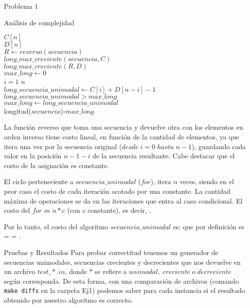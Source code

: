 \begin{section}{Problema 1}
\begin{subsection}{Análisis de complejidad}
		\vspace{0.5cm}
		\begin{pseudo}
			\tab $C[n]$\\
			\tab $D[n]$\\
			\tab $R \leftarrow reverso(secuencia)$ 		 \\
			\tab $long\_max\_creciente(secuencia,C)$ 	\\
			\tab $long\_max\_creciente(R,D)$		\\
			\tab $max\_long \leftarrow 0$			\\
			\tab \FOR $i=1$ \TO $n$				\\
			\tab \tab $long\_secuencia\_unimodal\leftarrow C[i]+D[n-i]-1$ 	\\
			\tab \tab \IF $ long\_secuencia\_unimodal >  max\_long$ 	\\
			\tab \tab \tab $max\_long \leftarrow long\_secuencia\_unimodal$ \\
			\tab \RET longitud($secuencia$)-$max\_long$ 			\\
		\end{pseudo}
		
		La función reverso que toma una secuencia y devuelve otra con los elementos en orden inverso tiene costo lineal, en función 
		de la cantidad de elementos, ya que itera una vez por la secuencia original ($desde\; i=0\; hasta\; n-1$), guardando cada valor en 
		la posición $n-1-i$ de la secuencia resultante. Cabe destacar que el costo de la asignación es constante.

		El ciclo perteneciente a $secuencia\_unimodal$ ($for$), itera $n$ veces, siendo en el peor caso el costo de cada iteración acotado por una
		constante. La cantidad máxima de operaciones se da en las iteraciones que entra al caso condicional. El costo del $for$ es $n*c$ (con $c$ constante), es decir, .

		Por lo tanto, el costo del algoritmo $secuencia\_unimodal$ es:  que por definición es 
		 =  = .
		
	\end{subsection}

	\newpage

	\begin{subsection}{Pruebas y Resultados}
		Para probar correctitud tenemos un generador de secuencias unimodales, secuencias crecientes y decrecientes que nos devuelve en un archivo $test\_*.in$, donde $*$ se refiere a $unimodal,\; creciente\; o\; decreciente$ según corresponda. De esta forma, con una comparación de archivos (comando \texttt{make diffs} en la carpeta Ej1) podemos saber para cada instancia si el resultado obtenido por nuestro algoritmo es correcto.


\end{subsection}
\end{section}
